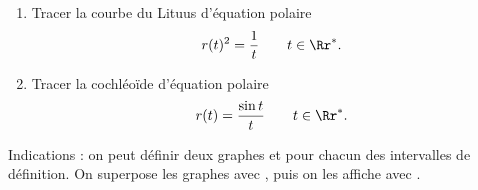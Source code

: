 \documentclass[class=report,crop=false]{standalone}
\begin{document}





\begin{tp}
\sauteligne
\begin{enumerate}
  \item Tracer la courbe du Lituus d'équation polaire 
  $$r(t)^2 = \frac{1}{t} \qquad t \in \Rr^*.$$
  \item Tracer la cochléoïde d'équation polaire 
  $$r(t) = \frac{\sin t}{t} \qquad t \in \Rr^*.$$
\end{enumerate} 
\end{tp}

Indications : on peut définir deux graphes  et 
 pour chacun des intervalles de définition. On superpose
les graphes avec , puis on les affiche avec 
.
\end{document}
